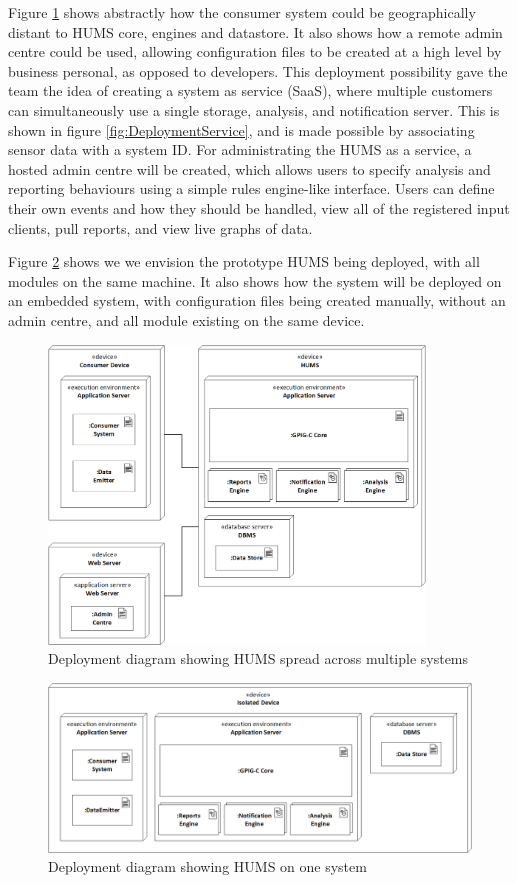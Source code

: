 \documentclass[10pt,a4paper]{article}
\begin{document}
Figure \ref{fig:DeploymentDistributed} shows abstractly how the consumer system could be geographically distant to HUMS core, engines and datastore. It also shows how a remote admin centre could be used, allowing configuration files to be created at a high level by business personal, as opposed to developers. This deployment possibility gave the team the idea of creating a system as service (SaaS), where multiple customers can simultaneously use a single storage, analysis, and notification server. 
This is shown in figure \ref{fig:DeploymentService}, and is made possible by associating sensor data with a system ID.
For administrating the HUMS as a service, a hosted admin
centre will be created, which allows users to specify analysis and reporting behaviours using a simple rules engine-like interface. Users can define their own events and how they should be handled, view all of the registered input clients, pull reports, and view live graphs of data.

Figure \ref{fig:DeploymentIsolated} shows we we envision the prototype HUMS being deployed, with all modules on the same machine. It also shows how the system will be deployed on an embedded system, with configuration files being created manually, without an admin centre, and  all module existing on the same device.
\begin{figure}[!ht]
  \centering
  \includegraphics[width=10cm]{images/DeploymentDistributed.png}
  \caption{Deployment diagram showing HUMS spread across multiple 
systems}
  \label{fig:DeploymentDistributed}
\end{figure}

\begin{figure}[!ht]
  \centering
  \includegraphics[width=12.5cm]{images/DeploymentIsolated.png}
  \caption{Deployment diagram showing HUMS on one system}
  \label{fig:DeploymentIsolated}
\end{figure}
\end{document}
